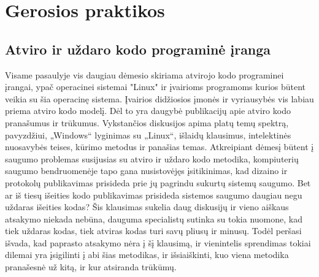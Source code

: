 \documentclass[a4paper,12pt,fleqn]{article}
\begin{document}
\newpage
\section{Gerosios praktikos}
\label{sec:motivation}
\subsection{Atviro ir uždaro kodo programinė įranga}
\label{sec:example}

Visame pasaulyje vis daugiau dėmesio skiriama atvirojo kodo programinei įrangai, ypač operacinei sistemai "Linux" ir įvairioms programoms kurios būtent veikia su šia operacinę sistema. Įvairios didžiosios įmonės ir vyriausybės vis labiau priema atviro kodo modelį. Dėl to yra daugybė publikacijų apie atviro kodo pranašumus ir trūkumus. Vykstančios diskusijos apima platų temų spektrą, pavyzdžiui, „Windows“ lyginimas su „Linux“, išlaidų klausimus, intelektinės nuosavybės teises, kūrimo metodus ir panašias temas. Atkreipiant dėmesį būtent į saugumo problemas susijusias su atviro ir uždaro kodo metodika, kompiuterių saugumo bendruomenėje tapo gana nusistovėjęs įsitikinimas, kad dizaino ir protokolų publikavimas prisideda prie jų pagrindu sukurtų sistemų saugumo\cite{hoepman2008increased}. Bet ar iš tiesų išeities kodo publikavimas prisideda sistemos saugumo daugiau negu uždaras išeities kodas? Šis klausimas sukelia daug diskusijų ir vieno aiškaus atsakymo niekada nebūna, dauguma specialistų sutinka su tokia nuomone, kad tiek uždaras kodas, tiek atviras kodas turi savų pliusų ir minusų. Todėl peršasi išvada, kad paprasto atsakymo nėra į šį klausimą, ir vienintelis sprendimas tokiai dilemai yra įsigilinti į abi šias metodikas, ir išsiaiškinti, kuo viena metodika pranašesnė už kitą, ir kur atsiranda trūkūmų.
\end{document}
